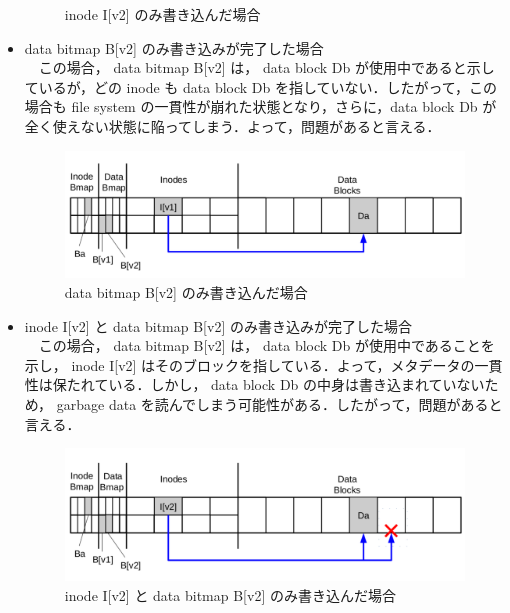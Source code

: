 \documentclass[graduation-thesis]{jsarticle}
\begin{document}
\begin{itemize}
\begin{figure}[H]
\begin{center}
		\caption{inode I[v2] のみ書き込んだ場合}
		\label{fig:data4}
	\end{center}
\end{figure}
	\item{data bitmap B[v2] のみ書き込みが完了した場合}\\
　この場合， data bitmap B[v2] は， data block Db が使用中であると示しているが，どの inode も data block Db を指していない．したがって，この場合も file system の一貫性が崩れた状態となり，さらに，data block Db が全く使えない状態に陥ってしまう．よって，問題があると言える．\\
\begin{figure}[H]
	\begin{center}
		\includegraphics[width=15.0cm,clip]{images/data5.pdf}
		\caption{data bitmap B[v2] のみ書き込んだ場合}
		\label{fig:data5}
	\end{center}
\end{figure}
	\item{inode I[v2] と data bitmap B[v2] のみ書き込みが完了した場合}\\
　この場合， data bitmap B[v2] は， data block Db が使用中であることを示し， inode I[v2] はそのブロックを指している．よって，メタデータの一貫性は保たれている．しかし， data block Db の中身は書き込まれていないため， garbage data を読んでしまう可能性がある．したがって，問題があると言える．\\
\begin{figure}[H]
	\begin{center}
		\includegraphics[width=15.0cm,clip]{images/data6.pdf}
		\caption{inode I[v2] と data bitmap B[v2] のみ書き込んだ場合}
		\label{fig:data6}

\end{center}
\end{figure}
\end{itemize}
\end{document}
